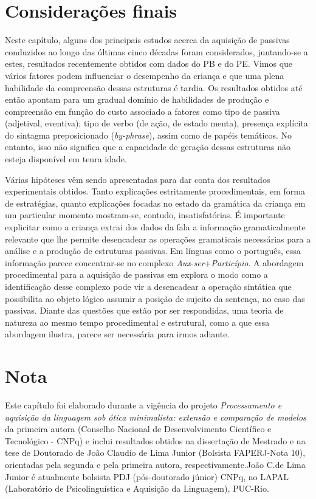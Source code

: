 \documentclass[output=paper]{LSP/langsci}
\begin{document}
\section{Considerações finais}
\label{sec:correapassiva_conclusao}

Neste capítulo, alguns dos principais estudos acerca da aquisição de passivas conduzidos ao longo das últimas cinco décadas foram considerados, juntando-se a estes, resultados recentemente obtidos com dados do PB e do PE. Vimos que vários fatores podem influenciar o desempenho da criança e que uma plena habilidade da compreensão dessas estruturas é tardia. Os resultados obtidos até então apontam para um gradual domínio de habilidades de produção e compreensão em função do custo associado a fatores como tipo de passiva (adjetival, eventiva); tipo de verbo (de ação, de estado menta), presença explícita do sintagma preposicionado (\textit{by-phrase}), assim como  de papéis temáticos. No entanto, isso não significa que a capacidade de geração dessas estruturas não esteja disponível em tenra idade.

Várias hipóteses vêm sendo apresentadas para dar conta dos resultados experimentais obtidos. Tanto explicações estritamente procedimentais, em forma de estratégias, quanto explicações focadas no estado da gramática da criança em um particular momento mostram-se, contudo, insatisfatórias. É importante explicitar como a criança extrai dos dados da fala a informação gramaticalmente relevante que lhe permite desencadear as operações gramaticais necessárias para a análise e a produção de estruturas passivas. Em línguas como o português, essa informação parece concentrar-se no complexo \textit{Aux}-\textit{ser}+\textit{Particípio}. A abordagem procedimental para a aquisição de passivas em \citet{correa_etal2016} explora o modo como a identificação desse complexo pode vir a desencadear a operação sintática que possibilita ao objeto lógico assumir a posição de sujeito da sentença, no caso das passivas. Diante das questões que estão por ser respondidas, uma teoria de natureza ao mesmo tempo procedimental e estrutural, como a que essa abordagem ilustra, parece ser necessária para irmos adiante. 

\section*{Nota}
Este capítulo foi elaborado durante a vigência do projeto \textit{Processamento e aquisição da linguagem sob ótica minimalista: extensão e comparação de modelos }da primeira autora (Conselho Nacional de Desenvolvimento Científico e Tecnológico - CNPq) e inclui resultados obtidos na dissertação de Mestrado e na tese de Doutorado de João Claudio de Lima Junior (Bolsista FAPERJ-Nota 10), orientadas pela segunda e pela primeira autora, respectivamente.João C.de Lima Junior é atualmente bolsista PDJ (pós-doutorado júnior) CNPq, no LAPAL (Laboratório de Psicolinguística e Aquisição da Linguagem), PUC-Rio.

{\sloppy
\printbibliography[heading=subbibliography,notkeyword=this]
}
\end{document}
